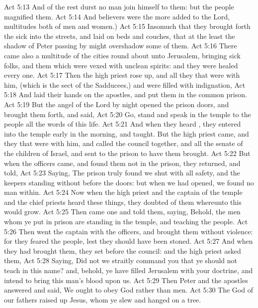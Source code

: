 \vs Act 5:13 And of the rest durst no man join himself to them: but the people magnified them.
\vs Act 5:14 And believers were the more added to the Lord, multitudes both of men and women.)
\vs Act 5:15 Insomuch that they brought forth the sick into the streets, and laid  on beds and couches, that at the least the shadow of Peter passing by might overshadow some of them.
\vs Act 5:16 There came also a multitude  of the cities round about unto Jerusalem, bringing sick folks, and them which were vexed with unclean spirits: and they were healed every one.
\vs Act 5:17 Then the high priest rose up, and all they that were with him, (which is the sect of the Sadducees,) and were filled with indignation,
\vs Act 5:18 And laid their hands on the apostles, and put them in the common prison.
\vs Act 5:19 But the angel of the Lord by night opened the prison doors, and brought them forth, and said,
\vs Act 5:20 Go, stand and speak in the temple to the people all the words of this life.
\vs Act 5:21 And when they heard , they entered into the temple early in the morning, and taught. But the high priest came, and they that were with him, and called the council together, and all the senate of the children of Israel, and sent to the prison to have them brought.
\vs Act 5:22 But when the officers came, and found them not in the prison, they returned, and told,
\vs Act 5:23 Saying, The prison truly found we shut with all safety, and the keepers standing without before the doors: but when we had opened, we found no man within.
\vs Act 5:24 Now when the high priest and the captain of the temple and the chief priests heard these things, they doubted of them whereunto this would grow.
\vs Act 5:25 Then came one and told them, saying, Behold, the men whom ye put in prison are standing in the temple, and teaching the people.
\vs Act 5:26 Then went the captain with the officers, and brought them without violence: for they feared the people, lest they should have been stoned.
\vs Act 5:27 And when they had brought them, they set  before the council: and the high priest asked them,
\vs Act 5:28 Saying, Did not we straitly command you that ye should not teach in this name? and, behold, ye have filled Jerusalem with your doctrine, and intend to bring this man's blood upon us.
\vs Act 5:29 Then Peter and the  apostles answered and said, We ought to obey God rather than men.
\vs Act 5:30 The God of our fathers raised up Jesus, whom ye slew and hanged on a tree.

